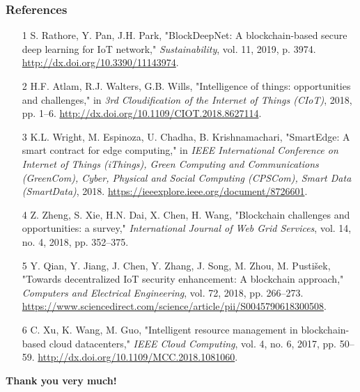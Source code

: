 \documentclass [xcolor=svgnames] {beamer}
\begin{document}
\begin{frame}[allowframebreaks]
\scriptsize
\frametitle{References}
\begin{itemize}
    \item[1] S. Rathore, Y. Pan, J.H. Park, "BlockDeepNet: A blockchain-based secure deep learning for IoT network," \textit{Sustainability}, vol. 11, 2019, p. 3974. \url{http://dx.doi.org/10.3390/11143974}.
    \item[2] H.F. Atlam, R.J. Walters, G.B. Wills, "Intelligence of things: opportunities and challenges," in \textit{3rd Cloudification of the Internet of Things (CIoT)}, 2018, pp. 1–6. \url{http://dx.doi.org/10.1109/CIOT.2018.8627114}.
    \item[3] K.L. Wright, M. Espinoza, U. Chadha, B. Krishnamachari, "SmartEdge: A smart contract for edge computing," in \textit{IEEE International Conference on Internet of Things (iThings), Green Computing and Communications (GreenCom), Cyber, Physical and Social Computing (CPSCom), Smart Data (SmartData)}, 2018. \url{https://ieeexplore.ieee.org/document/8726601}.
    \item[4] Z. Zheng, S. Xie, H.N. Dai, X. Chen, H. Wang, "Blockchain challenges and opportunities: a survey," \textit{International Journal of Web Grid Services}, vol. 14, no. 4, 2018, pp. 352–375.
    \item[5] Y. Qian, Y. Jiang, J. Chen, Y. Zhang, J. Song, M. Zhou, M. Pustišek, "Towards decentralized IoT security enhancement: A blockchain approach," \textit{Computers and Electrical Engineering}, vol. 72, 2018, pp. 266–273. \url{https://www.sciencedirect.com/science/article/pii/S0045790618300508}.
    \item[6] C. Xu, K. Wang, M. Guo, "Intelligent resource management in blockchain-based cloud datacenters," \textit{IEEE Cloud Computing}, vol. 4, no. 6, 2017, pp. 50–59. \url{http://dx.doi.org/10.1109/MCC.2018.1081060}.
\end{itemize}
\end{frame}


\begin{frame}
  \begin{center}
    \textbf{\Huge Thank you very much!}\\
  \end{center}
\end{frame}
    
\end{document}
